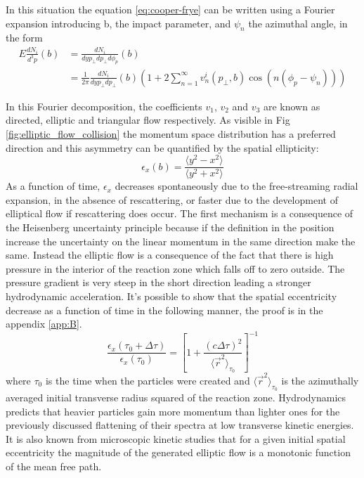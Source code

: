 \documentclass[12pt,a4paper]{book}
\begin{document}
	In this situation the equation \ref{eq:cooper-frye} can be written using a Fourier expansion introducing b, the impact parameter, and $\psi_n$ the azimuthal angle, in the form
	\begin{equation}
		\begin{aligned}
			E \frac{dN_i}{d^3 p}(b) &= \frac{dN_i}{dy p_\perp dp_\perp d\phi_p} (b) \\
			&= \frac{1}{2\pi} \frac{dN_i}{dy p_\perp dp_\perp} (b) \left( 1 + 2 \sum_{n=1}^{\infty} v_n^i(p_\perp,b) \cos(n(\phi_p-\psi_n)) \right)
		\end{aligned}
	\end{equation}
	
	In this Fourier decomposition, the coefficients $v_1$, $v_2$ and $v_3$ are known as directed, elliptic and triangular flow respectively. As visible in Fig \ref{fig:elliptic_flow_collision} the momentum space distribution has a preferred direction and this asymmetry can be quantified by the spatial ellipticity:
	\begin{equation}
		\epsilon_x(b)=\frac{\langle y^2 - x^2\rangle}{\langle y^2 + x^2\rangle}
		\label{eq:anisotropy}
	\end{equation}
	As a function of time, $\epsilon_x$ decreases spontaneously due to the free-streaming radial expansion, in the absence of rescattering, or faster due to the development of elliptical flow if rescattering does occur. The first mechanism is a consequence of the Heisenberg uncertainty principle because if the definition in the position increase the uncertainty on the linear momentum in the same direction make the same. Instead the elliptic flow is a consequence of the fact that there is high pressure in the interior of the reaction zone which falls off to zero outside. The pressure gradient is very steep in the short direction leading a stronger hydrodynamic acceleration.  It's possible to show that the spatial eccentricity decrease as a function of time in the following manner, the proof is in the appendix \ref{app:B}.
	\begin{equation}
		\frac{\epsilon_x(\tau_0 + \Delta \tau)}{\epsilon_x(\tau_0)} = \left[1+ \frac{(c \Delta \tau)^2}{\langle \vec{r}^2 \rangle_{\tau_0}} \right]^{-1}
	\end{equation}
	where $\tau_0$ is the time when the particles were created and $\langle \vec{r}^2 \rangle_{\tau_0}$ is the azimuthally averaged initial transverse radius squared of the reaction zone. Hydrodynamics predicts that heavier particles gain more momentum than lighter ones for the previously discussed flattening of their spectra at low transverse kinetic energies. It is also known from microscopic kinetic studies that for a given initial spatial eccentricity the magnitude of the generated elliptic flow is a monotonic function of the mean free path.
	
\end{document}

